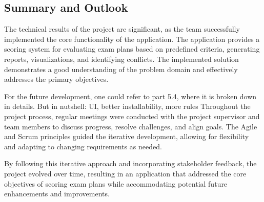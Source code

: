 \subsection{Summary and Outlook}

The technical results of the project are significant, as the team successfully implemented the core functionality of the application. The application provides a scoring system for evaluating exam plans based on predefined criteria, generating reports, visualizations, and identifying conflicts. The implemented solution demonstrates a good understanding of the problem domain and effectively addresses the primary objectives. 


\vspace{\baselineskip}


For the future development, one could refer to part 5.4, where it is broken down in details. But in nutshell: UI, better installability, more rules
Throughout the project process, regular meetings were conducted with the project supervisor and team members to discuss progress, resolve challenges, and align goals. The Agile and Scrum principles guided the iterative development, allowing for flexibility and adapting to changing requirements as needed.




\vspace{\baselineskip}


By following this iterative approach and incorporating stakeholder feedback, the project evolved over time, resulting in an application that addressed the core objectives of scoring exam plans while accommodating potential future enhancements and improvements.